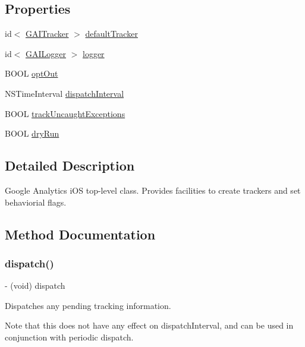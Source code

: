 \subsection*{Properties}
\begin{DoxyCompactItemize}
\item 
id$<$ \hyperlink{protocol_g_a_i_tracker-p}{G\+A\+I\+Tracker} $>$ \hyperlink{interface_g_a_i_a72941e445c4e4ec9b8c13b7f1cf73977}{default\+Tracker}
\item 
id$<$ \hyperlink{protocol_g_a_i_logger-p}{G\+A\+I\+Logger} $>$ \hyperlink{interface_g_a_i_a0f8b5edd02f567ee270b23b1d57264a3}{logger}
\item 
B\+O\+OL \hyperlink{interface_g_a_i_a9cff3fd3bd10af9b8560ef92cc0732a8}{opt\+Out}
\item 
N\+S\+Time\+Interval \hyperlink{interface_g_a_i_a6756ef050da75f9d4239831fa2a1fed2}{dispatch\+Interval}
\item 
B\+O\+OL \hyperlink{interface_g_a_i_a016993f03870e97448f5ab23f9cb13a9}{track\+Uncaught\+Exceptions}
\item 
B\+O\+OL \hyperlink{interface_g_a_i_aa42ce3bc919eeb55840c414c04d72497}{dry\+Run}
\end{DoxyCompactItemize}


\subsection{Detailed Description}
Google Analytics i\+OS top-\/level class. Provides facilities to create trackers and set behaviorial flags. 

\subsection{Method Documentation}
\mbox{\label{interface_g_a_i_ad4e8b6ff89df5bc200f2f6aa1877159c}} 
\subsubsection{\texorpdfstring{dispatch()}{dispatch()}}
{\footnotesize\ttfamily -\/ (void) dispatch \begin{DoxyParamCaption}{ }\end{DoxyParamCaption}}

Dispatches any pending tracking information.

Note that this does not have any effect on dispatch\+Interval, and can be used in conjunction with periodic dispatch. \mbox{\label{interface_g_a_i_a5ca71a28925068e89dd5b3e3c5433500}} 
